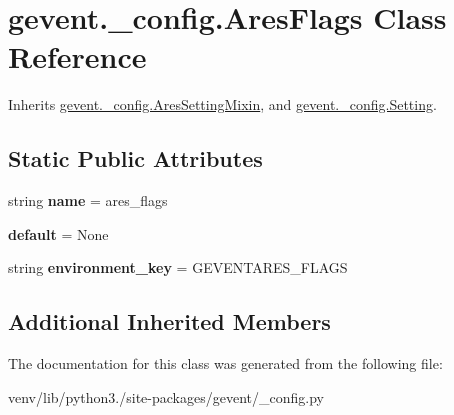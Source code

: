 \hypertarget{classgevent_1_1__config_1_1_ares_flags}{}\section{gevent.\+\_\+config.\+Ares\+Flags Class Reference}
\label{classgevent_1_1__config_1_1_ares_flags}


Inherits \hyperlink{classgevent_1_1__config_1_1_ares_setting_mixin}{gevent.\+\_\+config.\+Ares\+Setting\+Mixin}, and \hyperlink{classgevent_1_1__config_1_1_setting}{gevent.\+\_\+config.\+Setting}.

\subsection*{Static Public Attributes}
\begin{DoxyCompactItemize}
\item 
\mbox{\label{classgevent_1_1__config_1_1_ares_flags_ac2fd08ee27b8e0611326045a62a10863}} 
string {\bfseries name} = \textquotesingle{}ares\+\_\+flags\textquotesingle{}
\item 
\mbox{\label{classgevent_1_1__config_1_1_ares_flags_aea9a2b907124b41ecd4b464951d517fb}} 
{\bfseries default} = None
\item 
\mbox{\label{classgevent_1_1__config_1_1_ares_flags_a1ede92da3f3ca39b489d5e6c07cbf45a}} 
string {\bfseries environment\+\_\+key} = \textquotesingle{}G\+E\+V\+E\+N\+T\+A\+R\+E\+S\+\_\+\+F\+L\+A\+GS\textquotesingle{}
\end{DoxyCompactItemize}
\subsection*{Additional Inherited Members}


The documentation for this class was generated from the following file\+:\begin{DoxyCompactItemize}
\item 
venv/lib/python3./site-\/packages/gevent/\+\_\+config.\+py\end{DoxyCompactItemize}
